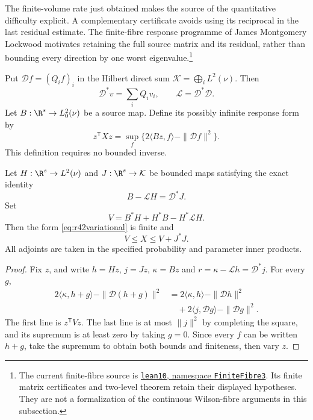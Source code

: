 The finite-volume rate just obtained makes the source of the
quantitative difficulty explicit. A complementary certificate avoids
using its reciprocal in the last residual estimate. The finite-fibre
response programme of James Montgomery Lockwood motivates retaining
the full source matrix and its residual, rather than bounding every
direction by one worst eigenvalue.\footnote{The current finite-fibre
source is \href{https://github.com/jlthermoelectric/4Y-M/blob/dc5807171ae1aa8de6cc455f7eb5756d415eec55/lean10}{\texttt{lean10}, namespace \texttt{FiniteFibre3}}.
Its finite matrix certificates and two-level theorem retain their
displayed hypotheses. They are not a formalization of the continuous
Wilson-fibre arguments in this subsection.}

Put $\mathcal Df=(Q_if)_i$ in the Hilbert direct sum
$\mathcal K=\bigoplus_iL^2(\nu)$. Then
\[
 \mathcal D^*v=\sum_iQ_iv_i,\qquad
 \mathscr L=\mathcal D^*\mathcal D.
\]
Let $B:\R^s\to L^2_0(\nu)$ be a source map. Define its possibly
infinite response form by
\begin{equation}\label{eq:r42variational}
 z^{\mathsf T}Xz=\sup_f\{2\langle Bz,f\rangle
                                   -\|\mathcal Df\|^2\}.
\end{equation}
This definition requires no bounded inverse.

\begin{theorem}
\label{thm:r42flux}
Let $H:\R^s\to L^2(\nu)$ and $J:\R^s\to\mathcal K$ be bounded
maps satisfying the exact identity
\begin{equation}\label{eq:r42fluxidentity}
 B-\mathscr LH=\mathcal D^*J.
\end{equation}
Set
\[
 V=B^*H+H^*B-H^*\mathscr LH.
\]
Then the form \eqref{eq:r42variational} is finite and
\begin{equation}\label{eq:r42fluxenclosure}
 V\le X\le V+J^*J.
\end{equation}
All adjoints are taken in the specified probability and parameter
inner products.
\end{theorem}
\begin{proof}
Fix $z$, and write $h=Hz$, $j=Jz$, $\kappa=Bz$ and
$r=\kappa-\mathscr Lh=\mathcal D^*j$. For every $g$,
\begin{align*}
 2\langle\kappa,h+g\rangle-\|\mathcal D(h+g)\|^2
 &=2\langle\kappa,h\rangle-\|\mathcal Dh\|^2\\
 &\quad+2\langle j,\mathcal Dg\rangle-\|\mathcal Dg\|^2.
\end{align*}
The first line is $z^{\mathsf T}Vz$. The last line is at most
$\|j\|^2$ by completing the square, and its supremum is at least zero
by taking $g=0$. Since every $f$ can be written $h+g$, take the
supremum to obtain both bounds and finiteness, then vary $z$.
\end{proof}

